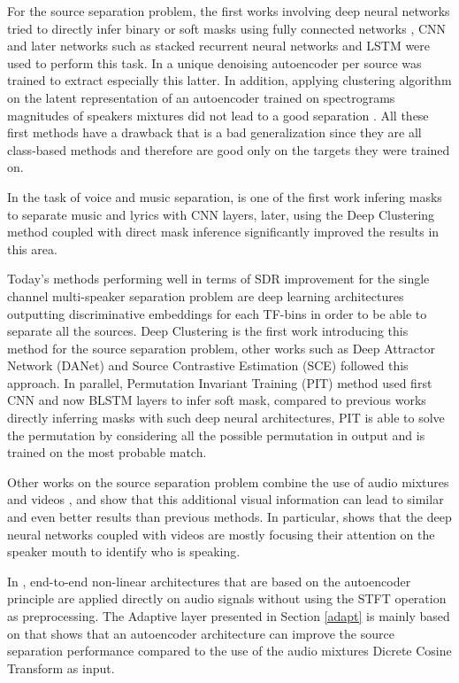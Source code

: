 \documentclass[master, tikz, final,11pt, dvipdfmx]{iscs-thesis}
\begin{document}
For the source separation problem, the first works involving deep neural networks tried to directly infer binary or soft masks using fully connected networks \cite{DNNSS, MASKDNN, MasksDNN, MASKDNN2}, CNN \cite{CNNrecog, Karaoke} and later networks such as stacked recurrent neural networks \cite{RNNSS, DNNSS2} and LSTM \cite{OverviewSSDL,LSTMSS, SpeechEnh} were used to perform this task. In \cite{AESS, AESS2} a unique  denoising autoencoder per source was trained to extract especially this latter. In addition, applying clustering algorithm on the latent representation of an autoencoder trained on spectrograms magnitudes of speakers mixtures did not lead to a good separation \cite{AESSsimple}. All these first methods have a drawback that is a bad generalization since they are all class-based methods and therefore are good only on the targets they were trained on. 

In the task of voice and music separation, \cite{Karaoke} is one of the first work infering masks to separate music and lyrics with CNN layers, later, \cite{chimera} using the Deep Clustering method coupled with direct mask inference significantly improved the results in this area.

Today's methods performing well in terms of SDR improvement for the single channel multi-speaker separation problem are deep learning architectures outputting discriminative embeddings for each TF-bins in order to be able to separate all the sources. Deep Clustering \cite{DPCLV1} is the first work introducing this method for the source separation problem, other works such as Deep Attractor Network (DANet) \cite{DANet} and Source Contrastive Estimation (SCE) \cite{SCE} followed this approach. In parallel, Permutation Invariant Training (PIT) \cite{PIT, PIT1, PIT_recog} method used first CNN and now BLSTM layers to infer soft mask, compared to previous works directly inferring masks with such deep neural architectures, PIT is able to solve the permutation by considering all the possible permutation in output and is trained on the most probable match. 

Other works on the source separation problem  combine the use of audio mixtures and videos \cite{DAVSE, ImageSS, SpeechEnh}, and show that this additional visual information can lead to similar and even better results than previous methods. In particular, \cite{ImageSS} shows that the deep neural networks coupled with videos are mostly focusing their attention on the speaker mouth to identify who is speaking.


In \cite{TAS, Adaptive}, end-to-end non-linear architectures that are based on the autoencoder principle are applied directly on audio signals without using the STFT operation as preprocessing. 
The Adaptive layer presented in Section \ref{adapt} is mainly based on \cite{Adaptive} that shows that an autoencoder architecture can improve the source separation performance compared to the use of the audio mixtures Dicrete Cosine Transform as input.
\end{document}
